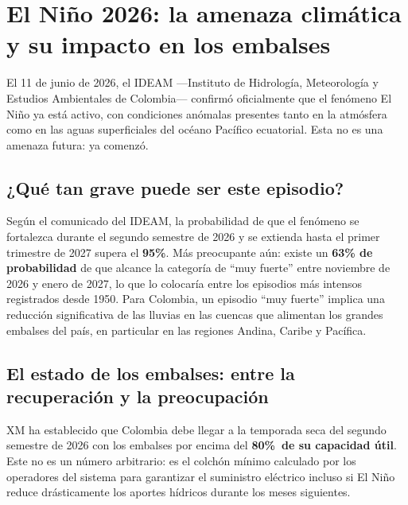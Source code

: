 \documentclass[11pt,a4paper]{article}
\newcommand{\METAXM}{80\%}
\begin{document}
\section{El Niño 2026: la amenaza climática y su impacto en los embalses}

El 11 de junio de 2026, el IDEAM —Instituto de Hidrología, Meteorología y Estudios Ambientales de Colombia— confirmó oficialmente que el fenómeno El Niño ya está activo, con condiciones anómalas presentes tanto en la atmósfera como en las aguas superficiales del océano Pacífico ecuatorial. Esta no es una amenaza futura: ya comenzó.

\subsection{¿Qué tan grave puede ser este episodio?}

Según el comunicado del IDEAM, la probabilidad de que el fenómeno se fortalezca durante el segundo semestre de 2026 y se extienda hasta el primer trimestre de 2027 supera el \textbf{95\%}. Más preocupante aún: existe un \textbf{63\% de probabilidad} de que alcance la categoría de ``muy fuerte'' entre noviembre de 2026 y enero de 2027, lo que lo colocaría entre los episodios más intensos registrados desde 1950. Para Colombia, un episodio ``muy fuerte'' implica una reducción significativa de las lluvias en las cuencas que alimentan los grandes embalses del país, en particular en las regiones Andina, Caribe y Pacífica.

\subsection{El estado de los embalses: entre la recuperación y la preocupación}

XM ha establecido que Colombia debe llegar a la temporada seca del segundo semestre de 2026 con los embalses por encima del \textbf{\METAXM\ de su capacidad útil}. Este no es un número arbitrario: es el colchón mínimo calculado por los operadores del sistema para garantizar el suministro eléctrico incluso si El Niño reduce drásticamente los aportes hídricos durante los meses siguientes.
\end{document}
